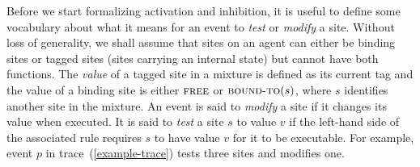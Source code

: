 Before we start formalizing activation and inhibition, it is useful to
define some vocabulary about what it means for an event to \emph{test}
or \emph{modify} a site. Without loss of generality, we shall assume
that sites on an agent can either be binding sites or tagged sites
(sites carrying an internal state) but cannot have both functions. The
\textit{value} of a tagged site in a mixture is defined as its current
tag and the value of a binding site is either $\textsc{free}$ or
$\textsc{bound-to}(s)$, where $s$ identifies another site in the
mixture.  An event is said to \emph{modify} a site if it changes its
value when executed. It is said to \emph{test} a site $s$ to value $v$
if the left-hand side of the associated rule requires $s$ to have
value $v$ for it to be executable. For example, event $p$ in
trace~(\ref{example-trace}) tests three sites and modifies one.






